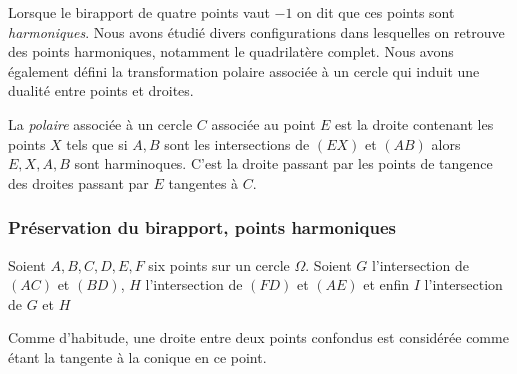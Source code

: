 Lorsque le birapport de quatre points vaut $-1$ on dit que ces points sont \textit{harmoniques}. Nous avons étudié divers configurations dans lesquelles on retrouve des points harmoniques, notamment le quadrilatère complet. Nous avons également défini la transformation polaire associée à un cercle qui induit une dualité entre points et droites.

\begin{dfn}
La \textit{polaire} associée à un cercle $C$ associée au point $E$ est la droite contenant les points $X$ tels que si $A,B$ sont les intersections de $(EX)$ et $(AB)$ alors $E,X,A,B$ sont harminoques. C'est la droite passant par les points de tangence des droites passant par $E$ tangentes à $C$.
\end{dfn}

\subsubsection{Préservation du birapport, points harmoniques}

\begin{thm}
Soient $A,B,C,D,E,F$ six points sur un cercle $\Omega$. Soient $G$ l'intersection de $(AC)$ et $(BD)$, $H$ l'intersection de $(FD)$ et $(AE)$ et enfin $I$ l'intersection de $G$ et $H$
\end{thm}

\begin{rem}
Comme d'habitude, une droite entre deux points confondus est considérée comme étant la tangente à la conique en ce point.
\end{rem}

